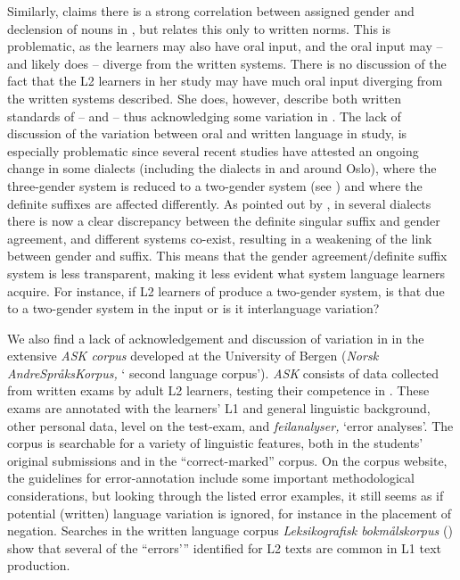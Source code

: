\documentclass[output=paper,colorlinks,citecolor=brown,modfonts,nonflat]{../langscibook}
\begin{document}
Similarly, \citet{Ragnhildstveit2017} claims there is a strong correlation between assigned gender and declension of nouns in , but relates this only to written norms. This is problematic, as the learners may also have oral input, and the oral input may – and likely does – diverge from the written systems. There is no discussion of the fact that the L2 learners in her study may have much oral input diverging from the written systems described. She does, however, describe both written standards of  –  and  – thus acknowledging some variation in . The lack of discussion of the variation between oral and written language in  study, is especially problematic since several recent studies have attested an ongoing change in some  dialects (including the dialects in and around Oslo), where the three-gender system is reduced to a two-gender system (see \citealt{Lødrup2011, RodinaWestergaard2015Germanic,BusterudEtAl2019}) and where the definite suffixes are affected differently. As pointed out by \citet{EmilsenInPreparation}, in several dialects there is now a clear discrepancy between the definite singular suffix and gender agreement, and different systems co-exist, resulting in a weakening of the link between gender and suffix. This means that the gender agreement/definite suffix system is less transparent, making it less evident what system language learners acquire. For instance, if L2 learners of  produce a two-gender system, is that due to a two-gender system in the input or is it interlanguage variation?

We also find a lack of acknowledgement and discussion of variation in  in the extensive \textit{ASK corpus} developed at the University of Bergen (\textit{Norsk AndreSpråksKorpus,} ‘ second language corpus’). \textit{ASK} consists of data collected from written exams by adult L2 learners, testing their competence in . These exams are annotated with the learners’ L1 and general linguistic background, other personal data, level on the test-exam, and \textit{feilanalyser,} ‘error analyses’. The corpus is searchable for a variety of linguistic features, both in the students’ original submissions and in the ``correct-marked'' corpus. On the corpus website, the guidelines for error-annotation include some important methodological considerations, but looking through the listed error examples, it still seems as if potential (written) language variation is ignored, for instance in the placement of negation. Searches in the written language corpus \textit{Leksikografisk bokmålskorpus} (\citealt{KnudsenFjeld2013}) show that several of the ``errors’'' identified for L2 texts are common in L1 text production.
\end{document}
